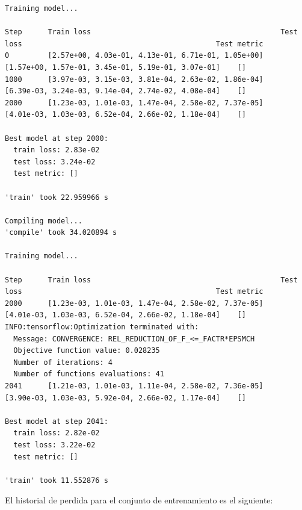 \documentclass[
  spanish,
  us-letterpaper,
  DIV=11,
  numbers=noendperiod]{scrreprt}
\begin{document}
\begin{verbatim}
Training model...

Step      Train loss                                            Test loss                                             Test metric
0         [2.57e+00, 4.03e-01, 4.13e-01, 6.71e-01, 1.05e+00]    [1.57e+00, 1.57e-01, 3.45e-01, 5.19e-01, 3.07e-01]    []  
1000      [3.97e-03, 3.15e-03, 3.81e-04, 2.63e-02, 1.86e-04]    [6.39e-03, 3.24e-03, 9.14e-04, 2.74e-02, 4.08e-04]    []  
2000      [1.23e-03, 1.01e-03, 1.47e-04, 2.58e-02, 7.37e-05]    [4.01e-03, 1.03e-03, 6.52e-04, 2.66e-02, 1.18e-04]    []  

Best model at step 2000:
  train loss: 2.83e-02
  test loss: 3.24e-02
  test metric: []

'train' took 22.959966 s

Compiling model...
'compile' took 34.020894 s

Training model...

Step      Train loss                                            Test loss                                             Test metric
2000      [1.23e-03, 1.01e-03, 1.47e-04, 2.58e-02, 7.37e-05]    [4.01e-03, 1.03e-03, 6.52e-04, 2.66e-02, 1.18e-04]    []  
INFO:tensorflow:Optimization terminated with:
  Message: CONVERGENCE: REL_REDUCTION_OF_F_<=_FACTR*EPSMCH
  Objective function value: 0.028235
  Number of iterations: 4
  Number of functions evaluations: 41
2041      [1.21e-03, 1.01e-03, 1.11e-04, 2.58e-02, 7.36e-05]    [3.90e-03, 1.03e-03, 5.92e-04, 2.66e-02, 1.17e-04]    []  

Best model at step 2041:
  train loss: 2.82e-02
  test loss: 3.22e-02
  test metric: []

'train' took 11.552876 s
\end{verbatim}

El historial de perdida para el conjunto de entrenamiento es el
siguiente:
\end{document}
